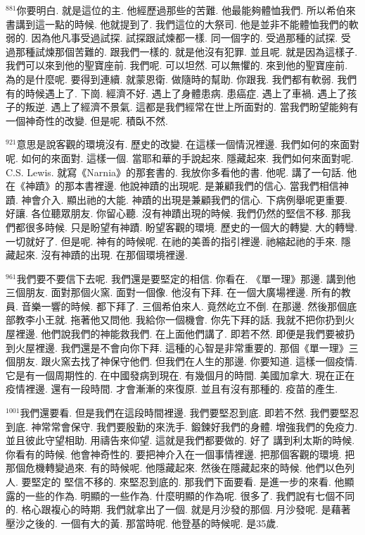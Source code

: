 \documentclass{book}
\begin{document}
$^{881}$你要明白.
就是這位的主.
他經歷過那些的苦難.
他最能夠體恤我們.
所以希伯來書講到這一點的時候.
他就提到了.
我們這位的大祭司.
他是並非不能體恤我們的軟弱的.
因為他凡事受過試探.
試探跟試煉都一樣.
同一個字的.
受過那種的試探.
受過那種試煉那個苦難的.
跟我們一樣的.
就是他沒有犯罪.
並且呢.
就是因為這樣子.
我們可以來到他的聖寶座前.
我們呢.
可以坦然.
可以無懼的.
來到他的聖寶座前.
為的是什麼呢.
要得到連續.
就蒙恩衛.
做隨時的幫助.
你跟我.
我們都有軟弱.
我們有的時候遇上了.
下崗.
經濟不好.
遇上了身體患病.
患癌症.
遇上了車禍.
遇上了孩子的叛逆.
遇上了經濟不景氣.
這都是我們經常在世上所面對的.
當我們盼望能夠有一個神奇性的改變.
但是呢.
積臥不然.

$^{921}$意思是說客觀的環境沒有.
歷史的改變.
在這樣一個情況裡邊.
我們如何的來面對呢.
如何的來面對.
這樣一個.
當耶和華的手說起來.
隱藏起來.
我們如何來面對呢.
C.S. Lewis.
就寫《Narnia》的那套書的.
我放你多看他的書.
他呢.
講了一句話.
他在《神蹟》的那本書裡邊.
他說神蹟的出現呢.
是兼顧我們的信心.
當我們相信神蹟.
神會介入.
顯出祂的大能.
神蹟的出現是兼顧我們的信心.
下病例舉呢更重要.
好讓.
各位聽眾朋友.
你留心聽.
沒有神蹟出現的時候.
我們仍然的堅信不移.
那我們都很多時候.
只是盼望有神蹟.
盼望客觀的環境.
歷史的一個大的轉變.
大的轉彎.
一切就好了.
但是呢.
神有的時候呢.
在祂的美善的指引裡邊.
祂縮起祂的手來.
隱藏起來.
沒有神蹟的出現.
在那個環境裡邊.

$^{961}$我們要不要信下去呢.
我們還是要堅定的相信.
你看在.
《單一理》那邊.
講到他三個朋友.
面對那個火窯.
面對一個像.
他沒有下拜.
在一個大廣場裡邊.
所有的教員.
音樂一響的時候.
都下拜了.
三個希伯來人.
竟然屹立不倒.
在那邊.
然後那個底部教李小王就.
拖著他又問他.
我給你一個機會.
你先下拜的話.
我就不把你扔到火屋裡邊.
他們說我們的神能救我們.
在上面他們講了.
即若不然.
即便是我們要被扔到火屋裡邊.
我們還是不會向你下拜.
這種的心智是非常重要的.
那個《單一理》三個朋友.
跟火窯去找了神保守他們.
但我們在人生的那邊.
你要知道.
這樣一個疫情.
它是有一個周期性的.
在中國發病到現在.
有幾個月的時間.
美國加拿大.
現在正在疫情裡邊.
還有一段時間.
才會漸漸的來復原.
並且有沒有那種的.
疫苗的產生.

$^{1001}$我們還要看.
但是我們在這段時間裡邊.
我們要堅忍到底.
即若不然.
我們要堅忍到底.
神常常會保守.
我們要殷勤的來洗手.
鍛鍊好我們的身體.
增強我們的免疫力.
並且彼此守望相助.
用禱告來仰望.
這就是我們都要做的.
好了 講到利太斯的時候.
你看有的時候.
他會神奇性的.
要把神介入在一個事情裡邊.
把那個客觀的環境.
把那個危機轉變過來.
有的時候呢.
他隱藏起來.
然後在隱藏起來的時候.
他們以色列人.
要堅定的 堅信不移的.
來堅忍到底的.
那我們下面要看.
是進一步的來看.
他顯露的一些的作為.
明顯的一些作為.
什麼明顯的作為呢.
很多了.
我們說有七個不同的.
格心跟複心的時期.
我們就拿出了一個.
就是月沙發的那個.
月沙發呢.
是藉著壓沙之後的.
一個有大的黃.
那當時呢.
他登基的時候呢.
是35歲.
\end{document}
